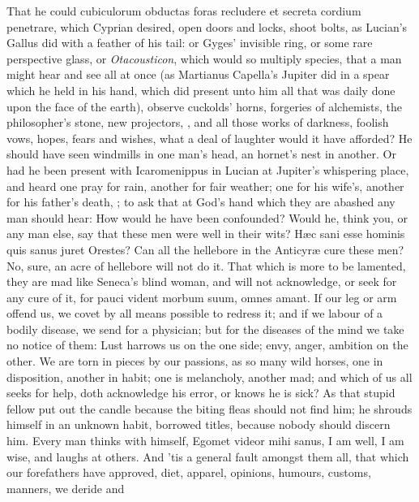 {That he could cubiculorum obductas foras recludere et secreta cordium
penetrare, which Cyprian desired, open doors and locks, shoot
bolts, as Lucian's Gallus did with a feather of his tail: or Gyges'
invisible ring, or some rare perspective glass, or \emph{Otacousticon},
which would so multiply species, that a man might hear and see all at
once (as  Martianus Capella's Jupiter did in a spear which he held
in his hand, which did present unto him all that was daily done upon
the face of the earth), observe cuckolds' horns, forgeries of
alchemists, the philosopher's stone, new projectors, \etc{}, and all those
works of darkness, foolish vows, hopes, fears and wishes, what a deal
of laughter would it have afforded? He should have seen windmills in
one man's head, an hornet's nest in another. Or had he been present
with Icaromenippus in Lucian at Jupiter's whispering place, and
heard one pray for rain, another for fair weather; one for his wife's,
another for his father's death, \etc{}; to ask that at God's hand which
they are abashed any man should hear: How would he have been
confounded? Would he, think you, or any man else, say that these men
were well in their wits? H\ae{}c sani esse hominis quis sanus juret
Orestes? Can all the hellebore in the Anticyr\ae{} cure these men? No,
sure, an acre of hellebore will not do it.
That which is more to be lamented, they are mad like Seneca's blind
woman, and will not acknowledge, or seek for any cure of it, for
pauci vident morbum suum, omnes amant. If our leg or arm offend us, we
covet by all means possible to redress it; and if we labour of a
bodily disease, we send for a physician; but for the diseases of the
mind we take no notice of them: Lust harrows us on the one side;
envy, anger, ambition on the other. We are torn in pieces by our
passions, as so many wild horses, one in disposition, another in habit;
one is melancholy, another mad; and which of us all seeks for
help, doth acknowledge his error, or knows he is sick? As that stupid
fellow put out the candle because the biting fleas should not find him;
he shrouds himself in an unknown habit, borrowed titles, because nobody
should discern him. Every man thinks with himself, Egomet videor mihi
sanus, I am well, I am wise, and laughs at others. And 'tis a general
fault amongst them all, that  which our forefathers have approved,
diet, apparel, opinions, humours, customs, manners, we deride and
}
